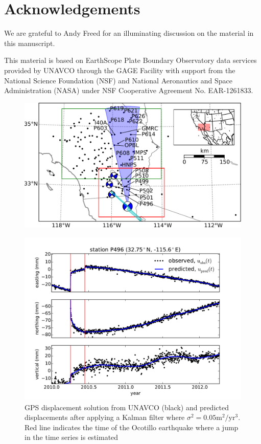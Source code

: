 \documentclass[12pt]{article}
\begin{document}
\section*{Acknowledgements}
We are grateful to Andy Freed for an illuminating discussion on the material in this manuscript.  
 
This material is based on EarthScope Plate Boundary Observatory data services provided by UNAVCO through the GAGE Facility with support from the National Science Foundation (NSF) and National Aeronautics and Space Administration (NASA) under NSF Cooperative Agreement No. EAR-1261833.




\begin{figure}
\includegraphics[scale=0.9]{Figures/context_map}
\centering 
\caption{}
\label{fig:ContextMap}
\end{figure}

\begin{figure}
\includegraphics[scale=0.6]{Figures/figure_1}
\centering
\caption{GPS displacement solution from UNAVCO (black) and predicted displacements after applying a Kalman filter where $\sigma^2=0.05 \mathrm{m}^2/\mathrm{yr}^3$. Red line indicates the time of the Ocotillo earthquake where a jump in the time series is estimated}
\label{fig:P496Fit}
\end{figure}
\end{document}
